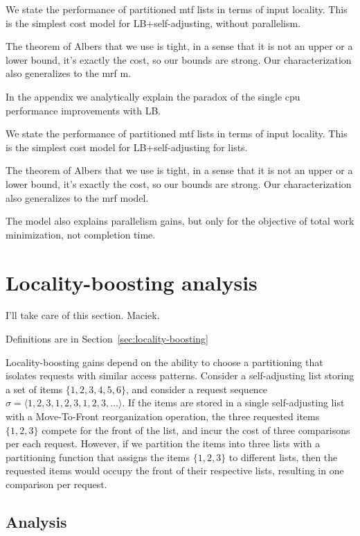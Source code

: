 We state the performance of partitioned mtf lists in terms of input locality. This is the simplest cost model for LB+self-adjusting, without parallelism.

The theorem of Albers that we use is tight, in a sense that it is not an upper or a lower bound, it's exactly the cost, so our bounds are strong. Our characterization also generalizes to the mrf m.








In the appendix we analytically explain the paradox of the single cpu performance improvements with LB.

We state the performance of partitioned mtf lists in terms of input locality. This is the simplest cost model for LB+self-adjusting for lists.

The theorem of Albers that we use is tight, in a sense that it is not an upper or a lower bound, it's exactly the cost, so our bounds are strong. Our characterization also generalizes to the mrf model.

The model also explains parallelism gains, but only for the objective of total work minimization, not completion time.

\section{Locality-boosting analysis}

I'll take care of this section. Maciek.


Definitions are in Section~\ref{sec:locality-boosting}

Locality-boosting gains depend on the ability to choose a partitioning that isolates requests with similar access patterns.
Consider a self-adjusting list
storing a set of items $\{ 1, 2, 3, 4, 5, 6 \}$, and consider a request sequence $\sigma = \langle 1, 2, 3, 1, 2, 3, 1, 2, 3, \ldots \rangle$.
If the items are stored in a single self-adjusting list with a Move-To-Front reorganization operation, the three requested items $\{1,2,3\}$ compete for the front of the list, and incur the cost of three comparisons per each request.
However, if we partition the items into three lists with a partitioning function that assigns the items $\{1, 2, 3\}$ to different lists, then the requested items would occupy the front of their respective lists, resulting in one comparison per request.

\subsection{Analysis}

